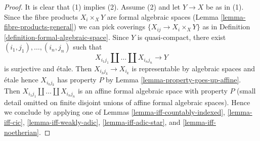 \documentclass{stacks-project}
\theoremstyle{plain}
\theoremstyle{definition}
\theoremstyle{remark}
\numberwithin{equation}{subsection}
\begin{document}
\begin{proof}
It is clear that (1) implies (2). Assume (2) and let
$Y \to X$ be as in (1). Since the fibre products $X_i \times_X Y$
are formal algebraic spaces (Lemma \ref{lemma-fibre-products-general})
we can pick coverings $\{X_{ij} \to X_i \times_X Y\}$ as in
Definition \ref{definition-formal-algebraic-space}.
Since $Y$ is quasi-compact, there exist
$(i_1, j_1), \ldots, (i_n, j_n)$ such that
$$
X_{i_1 j_1} \amalg \ldots \amalg X_{i_n j_n} \longrightarrow Y
$$
is surjective and \'etale. Then $X_{i_kj_k} \to X_{i_k}$ is representable
by algebraic spaces and \'etale hence $X_{i_kj_k}$ has property $P$ by
Lemma \ref{lemma-property-goes-up-affine}.
Then $X_{i_1 j_1} \amalg \ldots \amalg X_{i_n j_n}$ is an
affine formal algebraic space with property $P$ (small detail
omitted on finite disjoint unions of affine formal algebraic spaces).
Hence we conclude by applying one of
Lemmas \ref{lemma-iff-countably-indexed},
\ref{lemma-iff-cic},
\ref{lemma-iff-weakly-adic},
\ref{lemma-iff-adic-star}, and
\ref{lemma-iff-noetherian}.
\end{proof}
\end{document}
